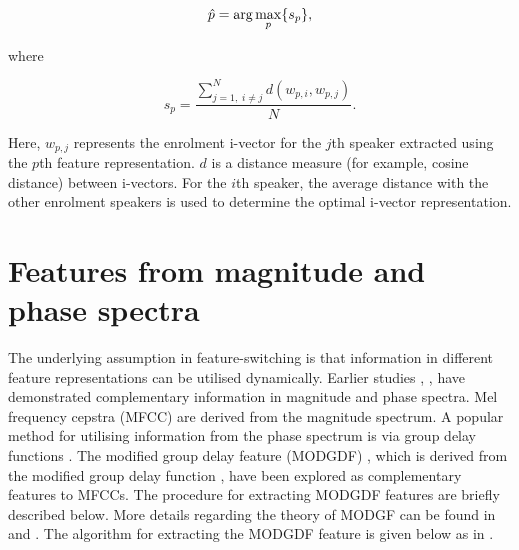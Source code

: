 \documentclass{article}
\begin{document}
\begin{equation}
\Hat{p} = \arg\max_p \{s_p\},
\label{eq:opt_ivec}
\end{equation}

where 

\begin{equation}
s_p = \frac{\displaystyle \sum_{j=1, \; i \neq j}^N d(w_{p,i},w_{p,j})}{N}.
\label{eq:sp}
\end{equation}

Here, $w_{p,j}$ represents the enrolment i-vector for the $j$th speaker
extracted using the $p$th feature representation. $d$ is a distance measure (for
example, cosine distance) between i-vectors. For the $i$th speaker, the average
distance with the other enrolment speakers is used to determine the optimal
i-vector representation. 

\section{Features from magnitude and phase spectra}
\label{sec:featExt}

The underlying assumption in feature-switching is that information in different
feature representations can be utilised dynamically. Earlier studies \cite{complement1},
\cite{complement2}, \cite{mgd_complement} have demonstrated complementary information in
magnitude and phase spectra. Mel frequency cepstra (MFCC) are derived from the magnitude
spectrum. A popular method for utilising information from the phase spectrum is
via group delay functions \cite{group_delay}. The modified group delay feature (MODGDF) 
\cite{modgd_feat}, which is derived from the modified group delay function
\cite{modgd_func}, have been explored as complementary features to MFCCs. The procedure for
extracting MODGDF features are briefly described below. More details regarding the theory
of MODGF can be found in \cite{modgd_func} and \cite{modgd_feat}. The algorithm for
extracting the MODGDF feature is given below as in \cite{hegdeModgdf}.
\end{document}
